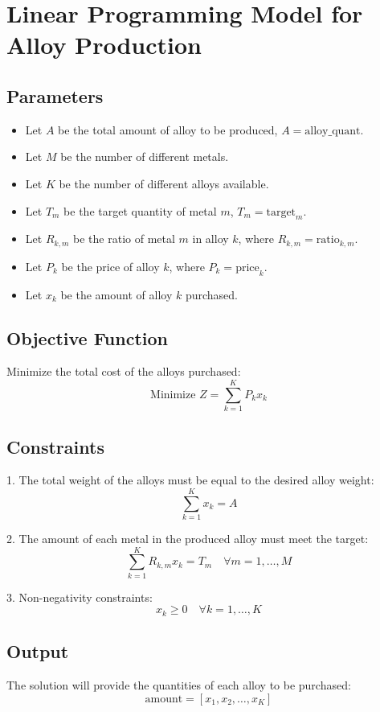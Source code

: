 \documentclass{article}
\begin{document}
\section*{Linear Programming Model for Alloy Production}

\subsection*{Parameters}
\begin{itemize}
    \item Let \( A \) be the total amount of alloy to be produced, \( A = \text{alloy\_quant} \).
    \item Let \( M \) be the number of different metals.
    \item Let \( K \) be the number of different alloys available.
    \item Let \( T_m \) be the target quantity of metal \( m \), \( T_m = \text{target}_{m} \).
    \item Let \( R_{k,m} \) be the ratio of metal \( m \) in alloy \( k \), where \( R_{k,m} = \text{ratio}_{k,m} \).
    \item Let \( P_k \) be the price of alloy \( k \), where \( P_k = \text{price}_{k} \).
    \item Let \( x_k \) be the amount of alloy \( k \) purchased.
\end{itemize}

\subsection*{Objective Function}
Minimize the total cost of the alloys purchased:
\[
\text{Minimize } Z = \sum_{k=1}^{K} P_k x_k
\]

\subsection*{Constraints}
1. The total weight of the alloys must be equal to the desired alloy weight:
\[
\sum_{k=1}^{K} x_k = A
\]

2. The amount of each metal in the produced alloy must meet the target:
\[
\sum_{k=1}^{K} R_{k,m} x_k = T_m \quad \forall m = 1, \ldots, M
\]

3. Non-negativity constraints:
\[
x_k \geq 0 \quad \forall k = 1, \ldots, K
\]

\subsection*{Output}
The solution will provide the quantities of each alloy to be purchased:
\[
\text{amount} = [x_1, x_2, \ldots, x_K]
\]
\end{document}
